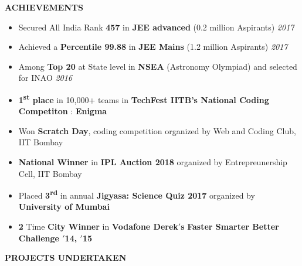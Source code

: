 \documentclass[11pt]{article}%
\begin{document}
\justifying
\noindent
\vspace*{3.5cm}
\begin{flushleft}
\bf{\bf{\LARGE{A}\Large{CHIEVEMENTS}}}
\end{flushleft}
\vspace{-6mm}
\hrulefill
\vspace{-2mm}
\vspace{-2mm}
\begin{itemize}
\setlength\itemsep{0.01em}
\item Secured All India Rank \textbf{457} in \textbf{JEE advanced} (0.2 million Aspirants) \hfill {{{\em {2017}}}}
\vspace{-1mm}
\item Achieved a \textbf{Percentile 99.88} in \textbf{JEE Mains} (1.2 million Aspirants) \hfill {{{\em {2017}}}}
\vspace{-1mm}
\item Among \textbf{Top 20} at State level in \textbf{NSEA} (Astronomy Olympiad) and selected for INAO \hfill {{{\em {2016}}}}
\vspace{-1mm}
\end{itemize}
\vspace{-5mm}
\vspace{-3mm}
\begin{itemize}
    \item {\bf 1\textsuperscript{st} place} in 10,000+ teams in {\bf TechFest IITB's National Coding Competiton} : {\bf Enigma}
    \vspace{-2.2mm}
    \item Won {\bf Scratch Day}, coding competition organized by Web and Coding Club, IIT Bombay
    \vspace{-2.2mm}
    \item {\bf National Winner} in {\bf  IPL Auction 2018} organized by Entrepreunership Cell, IIT Bombay
    \vspace{-0.22cm}
    \item Placed {\bf 3\textsuperscript{rd}} in annual {\bf Jigyasa: Science Quiz 2017} organized by {\bf University of Mumbai}
    \vspace{-2.2mm}
    \item \textbf 2 Time {\bf City Winner} in {\bf Vodafone Derek$'$s} {\bf Faster Smarter Better Challenge $'$14, $'$15}
\end{itemize}
\begin{flushleft}
\vspace{0mm}
\bf{\LARGE{P}\Large{ROJECTS} \LARGE{U}\Large{NDERTAKEN}}
\end{flushleft}
\vspace{-7mm}
\hrulefill
\vspace{-3mm}
\end{document}
